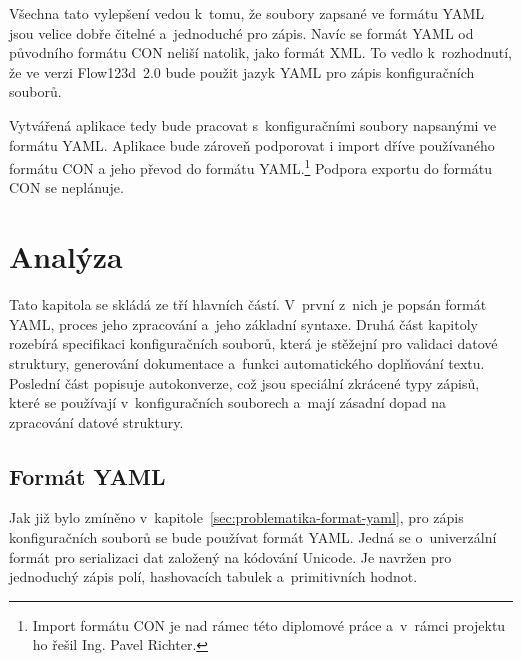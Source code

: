\documentclass[FM,bw,DP]{tulthesis}
\begin{document}
Všechna tato vylepšení vedou k~tomu, že soubory zapsané ve formátu \gls{YAML} jsou velice dobře čitelné a~jednoduché pro zápis. Navíc se formát \gls{YAML} od původního formátu \gls{CON} neliší natolik, jako formát \gls{XML}. To vedlo k~rozhodnutí, že ve verzi Flow123d~2.0 bude použit jazyk \gls{YAML} pro zápis konfiguračních souborů.

Vytvářená aplikace tedy bude pracovat s~konfiguračními soubory napsanými ve formátu \gls{YAML}. Aplikace bude zároveň podporovat i import dříve používaného formátu \gls{CON} a jeho převod do formátu \gls{YAML}.\footnote{Import formátu CON je nad rámec této diplomové práce a~v~rámci projektu ho řešil Ing. Pavel Richter.} Podpora exportu do formátu \gls{CON} se neplánuje.


\chapter{Analýza}


Tato kapitola se skládá ze tří hlavních částí. V~první z~nich je popsán formát \gls{YAML}, proces jeho zpracování a~jeho základní syntaxe. Druhá část kapitoly rozebírá specifikaci konfiguračních souborů, která je stěžejní pro validaci datové struktury, generování dokumentace a~funkci automatického doplňování textu. Poslední část popisuje autokonverze, což jsou speciální zkrácené typy zápisů, které se používají v~konfiguračních souborech a~mají zásadní dopad na zpracování datové struktury.




\section{Formát YAML}
Jak již bylo zmíněno v~kapitole~\ref{sec:problematika-format-yaml}, pro zápis konfiguračních souborů se bude používat formát \gls{YAML}. Jedná se o~univerzální formát pro serializaci dat založený na kódování Unicode. Je navržen pro jednoduchý zápis polí, hashovacích tabulek a~primitivních hodnot.
\end{document}
